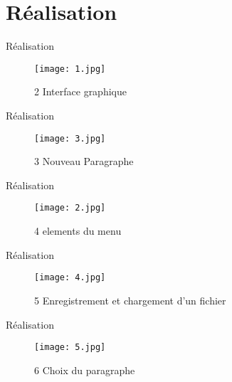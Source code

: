 \documentclass{beamer}
\begin{document}
\section{\textbf{Réalisation}}
\begin{frame}{Réalisation}
  \begin{figure}[ht]
    \begin{center}
        \texttt{[image: 1.jpg]} 
     \end{center}
     \caption{ 2 Interface graphique}
     \label{fig:mon_image}
 \end{figure}
\end{frame}{}

\begin{frame}{Réalisation}
  \begin{figure}[ht]
    \begin{center}
        \texttt{[image: 3.jpg]} 
     \end{center}
      \caption{ 3 Nouveau Paragraphe}
     \label{fig:mon_image}
  \end{figure}
\end{frame}{}

\begin{frame}{Réalisation}
  \begin{figure}[ht]
    \begin{center}
         \texttt{[image: 2.jpg]} 
     \end{center}
     \caption{ 4 elements du menu}
     \label{fig:mon_image}
 \end{figure}
\end{frame}{}



\begin{frame}{Réalisation}
   \begin{figure}[ht]
    \begin{center}
         \texttt{[image: 4.jpg]} 
     \end{center}
     \caption{ 5 Enregistrement et chargement d’un fichier}
     \label{fig:mon_image}
  \end{figure}
\end{frame}{}

\begin{frame}{Réalisation}
   \begin{figure}[ht]
    \begin{center}
         \texttt{[image: 5.jpg]} 
     \end{center}
     \caption{ 6 Choix du paragraphe}
    \label{fig:mon_image}
  \end{figure}
\end{frame}{}
\end{document}
